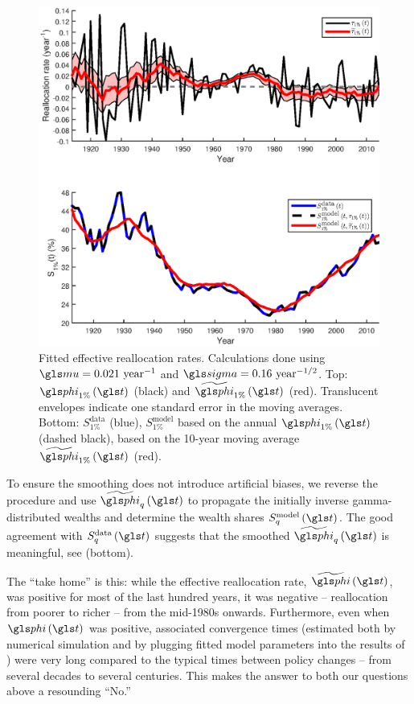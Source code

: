 \begin{figure}[!htb]
\centering
\includegraphics[width=1.0\textwidth] {./chapter_interactions/figs/tau_top1.eps}
\caption{Fitted effective reallocation rates. Calculations done using $\gmu=0.021 \text{ year}^{-1}$ and $\gsigma=0.16 \text{ year}^{-1/2}$. Top: $\gphi_{1\%}\left(\t\right)$ (black) and $\widetilde{\gphi}_{1\%}\left(\t\right)$ (red). Translucent envelopes indicate one standard error in the moving averages. Bottom: $S^{\text{data}}_{1\%}$ (blue), $S^{\text{model}}_{1\%}$ based on the annual $\gphi_{1\%}\left(\t\right)$ (dashed black), based on the 10-year moving average $\widetilde{\gphi}_{1\%}\left(\t\right)$ (red).}
\end{figure}

To ensure the smoothing does not introduce artificial biases, we reverse the procedure and use $\widetilde{\gphi}_q\left(\t\right)$ to propagate the initially inverse gamma-distributed wealths and determine the wealth shares $S^{\text{model}}_q\left(\t\right)$. The good agreement with $S^{\text{data}}_q\left(\t\right)$ suggests that the smoothed $\widetilde{\gphi}_q\left(\t\right)$ is meaningful, see  (bottom).

The ``take home'' is this: while the effective reallocation rate, $\widetilde{\gphi}\left(\t\right)$, was positive for most of the last hundred years, it was negative -- \ie reallocation from poorer to richer -- from the mid-1980s onwards. Furthermore, even when $\gphi\left(\t\right)$ was positive, associated convergence times (estimated both by numerical simulation and by plugging fitted model parameters into the results of ) were very long compared to the typical times between policy changes -- from several decades to several centuries. This makes the answer to both our questions above a resounding ``No.''

